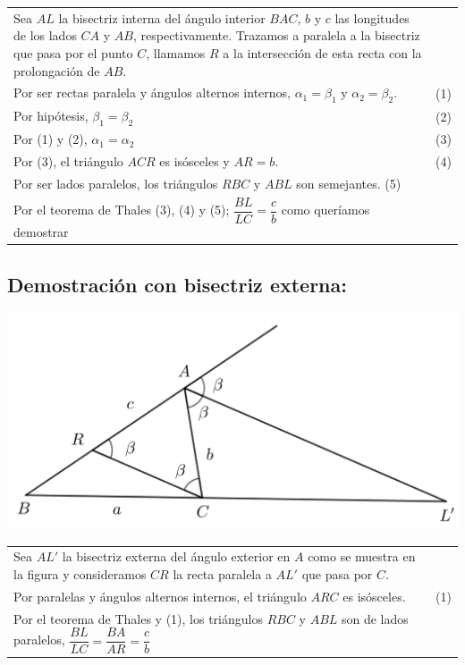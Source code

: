 \documentclass[12pt,a4paper]{article}
\begin{document}
\begin{tabular}{p{15.9 cm} p{1cm}}
Sea $AL$ la bisectriz interna del ángulo interior $BAC$, $b$ y $c$ las longitudes de los lados $CA$ y $AB$, respectivamente. Trazamos a paralela a la bisectriz que pasa por el punto $C$, llamamos $R$ a la intersección de esta recta con la prolongación de $AB$.
\\Por ser rectas paralela y ángulos alternos internos, $\alpha _1= \beta _1$ y $\alpha _2= \beta _2$. &(1)
\\Por hipótesis, $\beta _1= \beta _2$ &(2)
\\Por (1) y (2), $\alpha _1= \alpha _2$&(3)
\\Por (3), el triángulo $ACR$ es isósceles y $AR=b$. &(4)
\\Por ser lados paralelos, los triángulos $RBC$ y $ABL$ son semejantes. (5)
\\Por el teorema de Thales (3), (4) y (5); $\dfrac{BL}{LC} =\dfrac{c}{b}$ como queríamos demostrar
\end{tabular}
\subsection*{Demostración con bisectriz externa:}
\begin{center}
\includegraphics[scale=0.6]{Imagenes/bisectriz_ext.png} 
\end{center}
\begin{tabular}{p{15.9 cm} p{1cm}}
Sea $AL'$ la bisectriz externa del ángulo exterior en $A$ como se muestra en la figura y consideramos $CR$ la recta paralela a $AL'$ que pasa por $C$.
\\Por paralelas y ángulos alternos internos, el triángulo $ARC$ es isósceles. &(1)
\\Por el teorema de Thales y (1), los triángulos $RBC$ y $ABL$ son de lados paralelos, $\dfrac{BL}{LC}=\dfrac{BA}{AR}=\dfrac{c}{b}$
\end{tabular}
\end{document}

